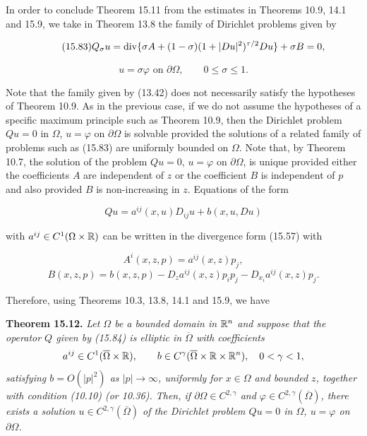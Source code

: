 In order to conclude Theorem 15.11 from the estimates in Theorems 10.9, 14.1
and 15.9, we take in Theorem 13.8 the family of Dirichlet problems given by

\begin{equation}\tag{15.83}
Q_\sigma u=\operatorname{div}\{\sigma A+(1-\sigma)(1+|Du|^2)^{\tau/2}Du\}+\sigma B=0,
\end{equation}

\[
u=\sigma\varphi \text{ on } \partial\Omega,\qquad 0\leq \sigma \leq 1.
\]

Note that the family given by (13.42) does not necessarily satisfy the hypotheses of
Theorem 10.9. As in the previous case, if we do not assume the hypotheses of a
specific maximum principle such as Theorem 10.9, then the Dirichlet problem
\(Qu=0\) in \(\Omega\), \(u=\varphi\) on \(\partial\Omega\) is solvable provided the solutions of a related family of
problems such as (15.83) are uniformly bounded on \(\Omega\). Note that, by Theorem 10.7,
the solution of the problem \(Qu=0\), \(u=\varphi\) on \(\partial\Omega\), is unique provided either the
coefficients \(A\) are independent of \(z\) or the coefficient \(B\) is independent of \(p\) and also
provided \(B\) is non-increasing in \(z\).
    Equations of the form

\begin{equation}\tag{15.84}
Qu=a^{ij}(x,u)D_{ij}u+b(x,u,Du)
\end{equation}

with \(a^{ij}\in C^1(\Omega\times \mathbb{R})\) can be written in the divergence form (15.57) with

\[
A^i(x,z,p)=a^{ij}(x,z)p_j,
\]
\[
B(x,z,p)=b(x,z,p)-D_z a^{ij}(x,z)p_ip_j-D_{x_i}a^{ij}(x,z)p_j.
\]


Therefore, using Theorems 10.3, 13.8, 14.1 and 15.9, we have

\medskip

\noindent\textbf{Theorem 15.12.} \emph{Let $\Omega$ be a bounded domain in $\mathbb{R}^n$ and suppose that the operator $Q$
given by (15.84) is elliptic in $\overline{\Omega}$ with coefficients
\[
 a^{ij} \in C^1(\overline{\Omega} \times \mathbb{R}), \qquad b \in C^\gamma(\overline{\Omega} \times \mathbb{R} \times \mathbb{R}^n), \quad 0 < \gamma < 1,
\]
satisfying $b = O(|p|^2)$ as $|p| \to \infty$, uniformly for $x \in \Omega$ and bounded $z$, together with
condition (10.10) (or 10.36). Then, if $\partial \Omega \in C^{2,\gamma}$ and $\varphi \in C^{2,\gamma}(\overline{\Omega})$, there exists a
solution $u \in C^{2,\gamma}(\overline{\Omega})$ of the Dirichlet problem $Qu = 0$ in $\Omega$, $u = \varphi$ on $\partial\Omega$.}

